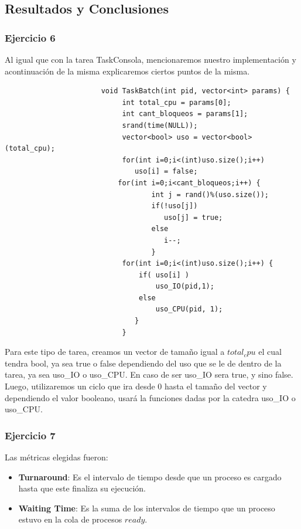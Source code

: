 \subsection{Resultados y Conclusiones}

\subsubsection[Resolución Ejercicio 6]{Ejercicio 6}

\indent Al igual que con la tarea TaskConsola, mencionaremos nuestro implementación y acontinuación de la misma 
explicaremos ciertos puntos de la misma.\\
 \begin{verbatim}
                       void TaskBatch(int pid, vector<int> params) {
                            int total_cpu = params[0];
                            int cant_bloqueos = params[1];
                            srand(time(NULL));
                            vector<bool> uso = vector<bool>(total_cpu);
                            for(int i=0;i<(int)uso.size();i++) 
                               uso[i] = false;
	                       for(int i=0;i<cant_bloqueos;i++) {
                                   int j = rand()%(uso.size());
                                   if(!uso[j])
                                      uso[j] = true;
                                   else
                                      i--; 
                                   }
                            for(int i=0;i<(int)uso.size();i++) {
                                if( uso[i] )
                                    uso_IO(pid,1); 
                                else
                                    uso_CPU(pid, 1); 
                               }
                            }
 \end{verbatim}

 \indent Para este tipo de tarea, creamos un vector de tamaño igual a $total_cpu$ el cual tendra bool, ya sea true o false
 dependiendo del uso que se le de dentro de la tarea, ya sea uso\_IO o uso\_CPU. En caso de ser uso\_IO sera true, y sino false.\\
 Luego, utilizaremos un ciclo que ira desde 0 hasta el tamaño del vector y dependiendo el valor booleano, usará la funciones
 dadas por la catedra uso\_IO o uso\_CPU.\\
 
 \subsubsection[Resolución Ejercicio 7]{Ejercicio 7}
 Las métricas elegidas fueron:
\begin{itemize}
 \item \textbf{Turnaround}: Es el intervalo de tiempo desde que un proceso es cargado hasta que este finaliza su ejecución.
 \item \textbf{Waiting Time}: Es la suma de los intervalos de tiempo que un proceso estuvo en la cola de procesos $ready$.
\end{itemize}


